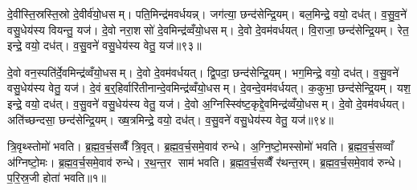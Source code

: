 दे॒वीस्ति॒स्रस्ति॒स्रो दे॒वीर्व॑यो॒धसम्। पति॒मिन्द्र॑मवर्धयन्न्। जग॑त्या॒ छन्द॑सेन्द्रि॒यम्। बल॒मिन्द्रे॒ वयो॒ दध॑त्। व॒सु॒व॒ने॑ वसु॒धेय॑स्य वियन्तु॒ यज॑। दे॒वो नरा॒शसो॑ दे॒वमिन्द्र॑व्वँयो॒धसम्। दे॒वो दे॒वम॑वर्धयत्। वि॒राजा॒ छन्द॑सेन्द्रि॒यम्। रेत॒ इन्द्रे॒ वयो॒ दध॑त्। व॒सु॒वने॑ वसु॒धेय॑स्य वेतु॒ यज॑॥९३॥

दे॒वो वन॒स्पति॑र्दे॒वमिन्द्र॑व्वँयो॒धसम्। दे॒वो दे॒वम॑वर्धयत्। द्वि॒पदा॒ छन्द॑सेन्द्रि॒यम्। भग॒मिन्द्रे॒ वयो॒ दध॑त्। व॒सु॒वने॑ वसु॒धेय॑स्य वेतु॒ यज॑। दे॒वं ब॒र्॒हिर्वारि॑तीनान्दे॒वमिन्द्र॑व्वँयो॒धसम्। दे॒वन्दे॒वम॑वर्धयत्। क॒कुभा॒ छन्द॑सेन्द्रि॒यम्। यश॒ इन्द्रे॒ वयो॒ दध॑त्। व॒सु॒वने॑ वसु॒धेय॑स्य वेतु॒ यज॑। दे॒वो अ॒ग्निस्स्वि॑ष्ट॒कृद्दे॒वमिन्द्र॑व्वँयो॒धसम्। दे॒वो दे॒वम॑वर्धयत्। अति॑च्छन्दसा॒ छन्द॑सेन्द्रि॒यम्। ख्ष॒त्रमिन्द्रे॒ वयो॒ दध॑त्। व॒सु॒वने॑ वसु॒धेय॑स्य वेतु॒ यज॑॥९४॥



\clearpage
{}
\setcounter{anuvakam}{0}
त्रि॒वृथ्स्तोमो॑ भवति। ब्र॒ह्म॒व॒र्च॒सव्वैँ त्रि॒वृत्। ब्र॒ह्म॒व॒र्च॒समे॒वाव॑ रुन्धे। अ॒ग्नि॒ष्टो॒मस्सोमो॑ भवति। ब्र॒ह्म॒व॒र्च॒सव्वाँ अ॑ग्निष्टो॒मः। ब्र॒ह्म॒व॒र्च॒समे॒वाव॑ रुन्धे। र॒थ॒न्त॒र साम॑ भवति। ब्र॒ह्म॒व॒र्च॒सव्वैँ र॑थन्त॒रम्। ब्र॒ह्म॒व॒र्च॒समे॒वाव॑ रुन्धे। प॒रि॒स्र॒जी होता॑ भवति॥१॥

